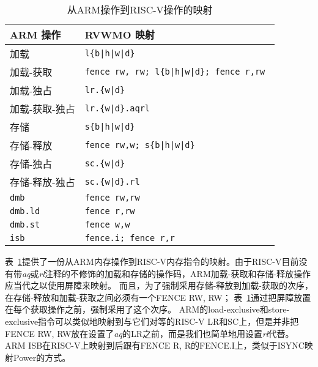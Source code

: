 \begin{table}[h!]
  \centering
  \begin{tabular}{|l|l|}
    \hline
    ARM 操作             & RVWMO 映射 \\
    \hline
    \hline
    加载                      & \tt l\{b|h|w|d\}  \\
    \hline
    加载-获取              & \tt fence rw, rw; l\{b|h|w|d\}; fence r,rw  \\
    \hline
    加载-独占            & \tt lr.\{w|d\}  \\
    \hline
    加载-获取-独占    & \tt lr.\{w|d\}.aqrl \\
    \hline
    存储                     & \tt s\{b|h|w|d\}  \\
    \hline
    存储-释放             & \tt fence rw,w; s\{b|h|w|d\}  \\
    \hline
    存储-独占           & \tt sc.\{w|d\}  \\
    \hline
    存储-释放-独占   & \tt sc.\{w|d\}.rl  \\
    \hline
    \tt dmb                   & \tt fence rw,rw \\
    \hline
    \tt dmb.ld                & \tt fence r,rw \\
    \hline
    \tt dmb.st                & \tt fence w,w \\
    \hline
    \tt isb                   & \tt fence.i; fence r,r \\
    \hline
  \end{tabular}
  \caption{从ARM操作到RISC-V操作的映射}
  \label{tab:armmappings}
\end{table}

表~\ref{tab:armmappings}提供了一份从ARM内存操作到RISC-V内存指令的映射。由于RISC-V目前没有带{\em aq}或{\em rl}注释的不修饰的加载和存储的操作码，ARM加载-获取和存储-释放操作应当代之以使用屏障来映射。
而且，为了强制采用存储-释放到加载-获取的次序，在存储-释放和加载-获取之间必须有一个FENCE RW, RW；
表~\ref{tab:armmappings}通过把屏障放置在每个获取操作之前，强制采用了这个次序。
ARM的load-exclusive和store-exclusive指令可以类似地映射到与它们对等的RISC-V LR和SC上，但是并非把FENCE RW, RW放在设置了{\em aq}的LR之前，而是我们也简单地用设置{\em rl}代替。
ARM ISB在RISC-V上映射到后跟有FENCE R, R的FENCE.I上，类似于ISYNC映射Power的方式。

